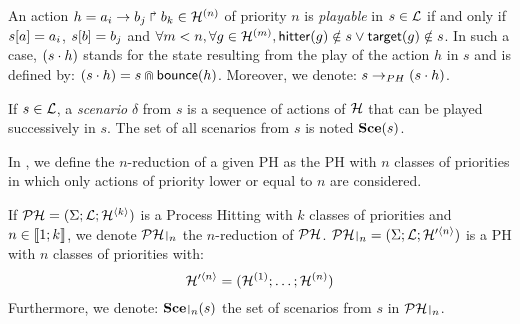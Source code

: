 \begin{definition}
\label{def:play}
  An action $h = a_i\rightarrow b_j\Rsh b_k \in \mathcal{H}^{(n)}$ of priority $n$ is \emph{playable} in $s \in \mathcal{L}$
  if and only if ${s[a]} = a_i$, ${s[b]} = b_j$ and $\forall m < n, \forall g \in \mathcal{H}^{(m)}, \mathsf{hitter}(g) \notin s \vee \mathsf{target}(g) \notin s$.
  In such a case, $(s \cdot h)$ stands for the state resulting from the play of the action $h$ in $s$ and is defined by: $(s \cdot h) = s \Cap \mathsf{bounce}(h)$.
  Moreover, we denote: $s \rightarrow_{PH} (s \cdot h)$.

  If $s \in \mathcal{L}$,
  a \emph{scenario} $\delta$ from $s$ is a sequence of actions of $\mathcal{H}$ that can be played successively in $s$.
  The set of all scenarios from $s$ is noted $\mathbf{Sce}(s)$.
\end{definition}

In , we define the $n$-reduction of a given PH as the PH with $n$ classes of priorities in which only actions of priority lower or equal to $n$ are considered.
\begin{definition}[PH $n$-reduction]
\label{def:restriction}
  If $\mathcal{PH} = (\Sigma; \mathcal{L}; \mathcal{H}^{\langle k \rangle})$ is a Process Hitting with $k$ classes of priorities and $n \in \llbracket 1; k \rrbracket$, we denote $\restriction{\PH}{n}$
  the $n$-reduction of $\mathcal{PH}$.
  $\restriction{\PH}{n} = (\PHs; \PHl; \PHa'^{\langle n \rangle})$ is a PH with $n$ classes of priorities with:
  $$\mathcal{H}'^{\langle n \rangle} = (\mathcal{H}^{(1)}; \dots; \mathcal{H}^{(n)})$$
  Furthermore, we denote: $\restriction{\Sce}{n}(s)$ the set of scenarios from $s$ in $\restriction{\PH}{n}$.
\end{definition}



